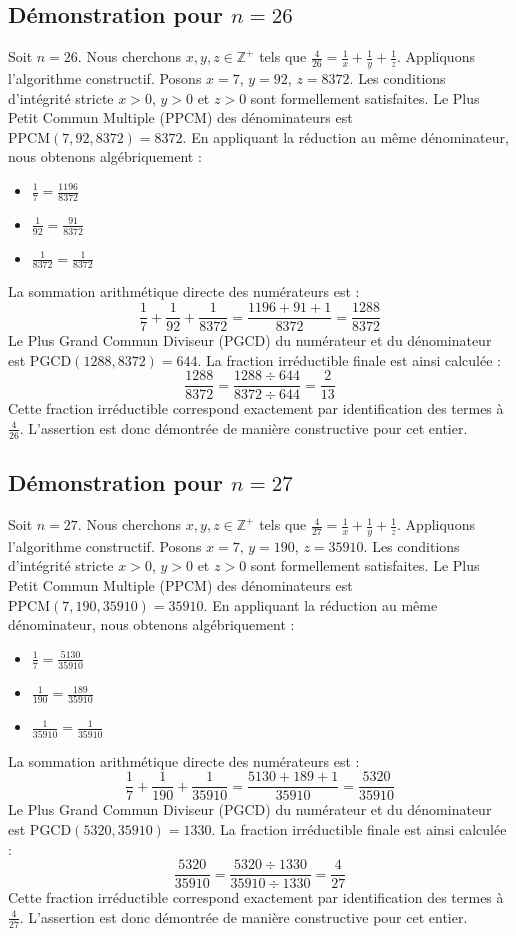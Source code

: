 \documentclass[11pt,a4paper]{article}
\begin{document}
\subsection{Démonstration pour $n = 26$}
Soit $n = 26$. Nous cherchons $x, y, z \in \mathbb{Z}^{+}$ tels que $\frac{4}{26} = \frac{1}{x} + \frac{1}{y} + \frac{1}{z}$.
Appliquons l'algorithme constructif. Posons $x = 7$, $y = 92$, $z = 8372$.
Les conditions d'intégrité stricte $x > 0$, $y > 0$ et $z > 0$ sont formellement satisfaites.
Le Plus Petit Commun Multiple (PPCM) des dénominateurs est $\text{PPCM}(7, 92, 8372) = 8372$.
En appliquant la réduction au même dénominateur, nous obtenons algébriquement :
\begin{itemize}
    \item $\frac{1}{7} = \frac{1196}{8372}$
    \item $\frac{1}{92} = \frac{91}{8372}$
    \item $\frac{1}{8372} = \frac{1}{8372}$
\end{itemize}
La sommation arithmétique directe des numérateurs est :
$$ \frac{1}{7} + \frac{1}{92} + \frac{1}{8372} = \frac{1196 + 91 + 1}{8372} = \frac{1288}{8372} $$
Le Plus Grand Commun Diviseur (PGCD) du numérateur et du dénominateur est $\text{PGCD}(1288, 8372) = 644$.
La fraction irréductible finale est ainsi calculée :
$$ \frac{1288}{8372} = \frac{1288 \div 644}{8372 \div 644} = \frac{2}{13} $$
Cette fraction irréductible correspond exactement par identification des termes à $\frac{4}{26}$. L'assertion est donc démontrée de manière constructive pour cet entier.

\subsection{Démonstration pour $n = 27$}
Soit $n = 27$. Nous cherchons $x, y, z \in \mathbb{Z}^{+}$ tels que $\frac{4}{27} = \frac{1}{x} + \frac{1}{y} + \frac{1}{z}$.
Appliquons l'algorithme constructif. Posons $x = 7$, $y = 190$, $z = 35910$.
Les conditions d'intégrité stricte $x > 0$, $y > 0$ et $z > 0$ sont formellement satisfaites.
Le Plus Petit Commun Multiple (PPCM) des dénominateurs est $\text{PPCM}(7, 190, 35910) = 35910$.
En appliquant la réduction au même dénominateur, nous obtenons algébriquement :
\begin{itemize}
    \item $\frac{1}{7} = \frac{5130}{35910}$
    \item $\frac{1}{190} = \frac{189}{35910}$
    \item $\frac{1}{35910} = \frac{1}{35910}$
\end{itemize}
La sommation arithmétique directe des numérateurs est :
$$ \frac{1}{7} + \frac{1}{190} + \frac{1}{35910} = \frac{5130 + 189 + 1}{35910} = \frac{5320}{35910} $$
Le Plus Grand Commun Diviseur (PGCD) du numérateur et du dénominateur est $\text{PGCD}(5320, 35910) = 1330$.
La fraction irréductible finale est ainsi calculée :
$$ \frac{5320}{35910} = \frac{5320 \div 1330}{35910 \div 1330} = \frac{4}{27} $$
Cette fraction irréductible correspond exactement par identification des termes à $\frac{4}{27}$. L'assertion est donc démontrée de manière constructive pour cet entier.
\end{document}
